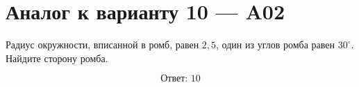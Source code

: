 


\section*{Аналог к варианту 10 — A02}
Радиус окружности, вписанной в ромб, равен \(2{,}5\), один из углов ромба равен \(30^\circ\). Найдите сторону ромба.
\begin{center}\figRhombusInradius\end{center}
\[\boxed{\text{Ответ: }10}\]

